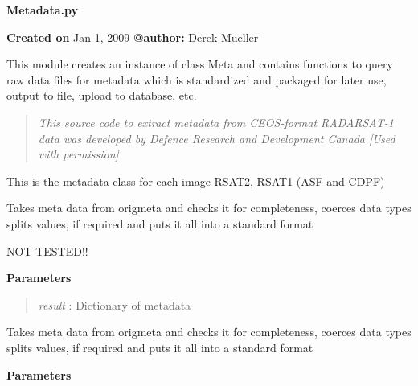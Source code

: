 \documentclass[letterpaper,10pt,english]{sphinxmanual}
\begin{document}
\label{code:module-Metadata}
\textbf{Metadata.py}

\textbf{Created on} Jan 1, 2009 \textbf{@author:} Derek Mueller

This module creates an instance of class Meta and contains functions to
query raw data files for metadata which is standardized and packaged for
later use, output to file, upload to database, etc.
\begin{quote}

\emph{This source code to extract metadata from CEOS-format RADARSAT-1 
data was developed by Defence Research and Development Canada
{[}Used with permission{]}}
\end{quote}

\begin{fulllineitems}
\label{code:Metadata.Metadata}
This is the metadata class for each image RSAT2, RSAT1 (ASF and CDPF)

\begin{fulllineitems}
\label{code:Metadata.Metadata.clean_metaASF}
Takes meta data from origmeta and checks it for completeness, coerces data types
splits values, if required and puts it all into a standard format

NOT TESTED!!

\textbf{Parameters}
\begin{quote}

\emph{result} : Dictionary of metadata
\end{quote}

\end{fulllineitems}


\begin{fulllineitems}
\label{code:Metadata.Metadata.clean_metaCDPF}
Takes meta data from origmeta and checks it for completeness, coerces data types
splits values, if required and puts it all into a standard format

\textbf{Parameters}
\begin{quote}


\end{quote}
\end{fulllineitems}
\end{fulllineitems}
\end{document}
